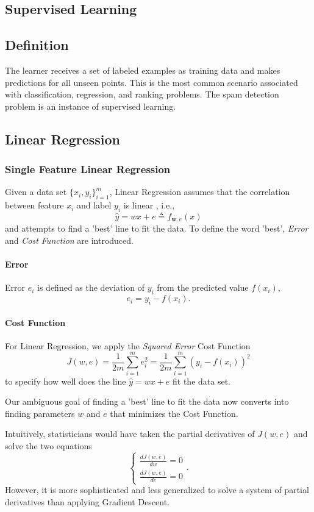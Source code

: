 \documentclass[12pt, twoside]{article}
\begin{document}
\begin{multicols*}{2}
\section{Supervised Learning}
	\subsection{Definition}
	The learner receives a set of labeled examples as training data and makes predictions for all unseen points. This is the most common scenario associated with classification, regression, and ranking problems. The spam detection problem is an instance of supervised learning.\cite{enwiki:1188072476}\cite{mohri2018foundations}
		
	\subsection{Linear Regression}
		\subsubsection{Single Feature Linear Regression}
		Given a data set $\{x_i,y_i\}_{i=1}^{m}$, Linear Regression assumes that the correlation between feature $x_i$ and label $y_i$ is linear , i.e.,
		$$ \hat{y}=wx+e \triangleq f_{\mathbf{w},e}(x) $$
		and attempts to find a 'best' line to fit the data. To define the word 'best', \textit{Error} and \textit{Cost Function} are introduced.\cite{Altman2015PointsOS}
		
			\paragraph{Error}
			Error $e_i$ is defined as the deviation of $ y_i $ from the predicted value $f(x_i)$,
			$$ e_i = y_i - f(x_i). $$
			
			\paragraph{Cost Function}
			For Linear Regression, we apply the \textit{Squared Error} Cost Function
			$$J(w,e)=\frac{1}{2m}\sum_{i=1}^{m}e_i^2=\frac{1}{2m}\sum_{i=1}^{m}(y_i - f(x_i))^2$$
			to specify how well does the line $\hat{y}=wx+e $ fit the data set.
		
		Our ambiguous goal of finding a 'best' line to fit the data now converts into finding parameters $w$ and $e$ that minimizes the Cost Function.
		
		Intuitively, statisticians would have taken the partial derivatives of $J(w,e)$ and solve the two equations
		$$
		\begin{cases}
			\frac{dJ(w,e)}{dw}=0 \\
			\frac{dJ(w,e)}{de}=0
		\end{cases}.
		$$
		However, it is more sophisticated and less generalized to solve a system of partial derivatives than applying  Gradient Descent.
		

\end{multicols*}
\end{document}
